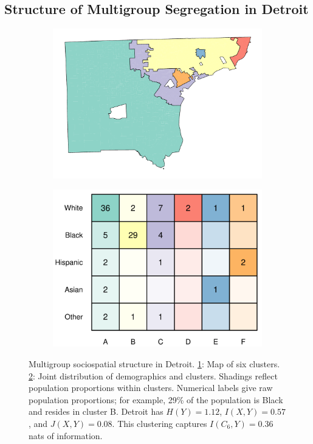 \documentclass[english]{scrartcl}
\begin{document}
	\subsection{Structure of Multigroup Segregation in Detroit}
		\begin{figure}
		\centering
			\begin{subfigure}[b]{0.45\textwidth}
			\includegraphics[width = \textwidth]{figs/example_cluster_map.pdf}
			\caption{} \label{subfig:detroit_map}
			\end{subfigure}
			\begin{subfigure}[b]{0.45\textwidth}
			\includegraphics[width = \textwidth]{figs/example_clusters_detailed.pdf}
			\caption{} \label{subfig:detroit_groups}
			\end{subfigure}
			\caption{Multigroup sociospatial structure in Detroit. \ref{subfig:detroit_map}: Map of six clusters. \ref{subfig:detroit_groups}: Joint distribution of demographics and clusters. Shadings reflect population proportions within clusters. Numerical labels give raw population proportions; for example, 29\% of the population is Black and resides in cluster B. Detroit has $H(Y) = 1.12$, $I(X,Y) = 0.57$, and $J(X,Y) = 0.08$. This clustering captures $I(C_6,Y) = 0.36$ nats of information.} \label{fig:detroit}
		\end{figure}
\end{document}
